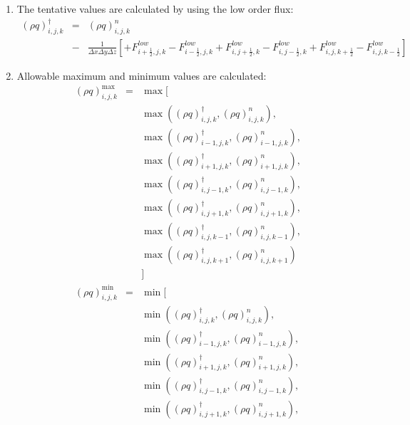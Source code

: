 \begin{enumerate}
%
\item The tentative values are calculated by using the low order flux:
\begin{eqnarray}
\left(\rho q\right)^{\dagger}_{i,j,k} 
&=& \left(\rho q\right)^{n}_{i,j,k}\nonumber\\
&-& \frac{1}{\Delta x \Delta y \Delta z}
\left[
+ F_{i+\frac{1}{2},j,k}^{low}-F_{i-\frac{1}{2},j,k}^{low}
+ F_{i,j+\frac{1}{2},k}^{low}-F_{i,j-\frac{1}{2},k}^{low}
+ F_{i,j,k+\frac{1}{2}}^{low}-F_{i,j,k-\frac{1}{2}}^{low}
\right]
\end{eqnarray}
%
\item Allowable maximum and minimum values are calculated:
\begin{eqnarray}
\left(\rho q\right)^{\max}_{i,j,k}
&=& \max [\nonumber\\
&&\max( \left(\rho q\right)^{\dagger}_{i,j,k},\left(\rho q\right)^{n}_{i,j,k} ),\nonumber\\
&&\max( \left(\rho q\right)^{\dagger}_{i-1,j,k},\left(\rho q\right)^{n}_{i-1,j,k} ),\nonumber\\
&&\max( \left(\rho q\right)^{\dagger}_{i+1,j,k},\left(\rho q\right)^{n}_{i+1,j,k} ),\nonumber\\
&&\max( \left(\rho q\right)^{\dagger}_{i,j-1,k},\left(\rho q\right)^{n}_{i,j-1,k} ),\nonumber\\
&&\max( \left(\rho q\right)^{\dagger}_{i,j+1,k},\left(\rho q\right)^{n}_{i,j+1,k} ),\nonumber\\
&&\max( \left(\rho q\right)^{\dagger}_{i,j,k-1},\left(\rho q\right)^{n}_{i,j,k-1} ),\nonumber\\
&&\max( \left(\rho q\right)^{\dagger}_{i,j,k+1},\left(\rho q\right)^{n}_{i,j,k+1} ) \nonumber\\
&&]\\
\left(\rho q\right)^{\min}_{i,j,k}
&=& \min [\nonumber\\
&&\min( \left(\rho q\right)^{\dagger}_{i,j,k},\left(\rho q\right)^{n}_{i,j,k} ),\nonumber\\
&&\min( \left(\rho q\right)^{\dagger}_{i-1,j,k},\left(\rho q\right)^{n}_{i-1,j,k} ),\nonumber\\
&&\min( \left(\rho q\right)^{\dagger}_{i+1,j,k},\left(\rho q\right)^{n}_{i+1,j,k} ),\nonumber\\
&&\min( \left(\rho q\right)^{\dagger}_{i,j-1,k},\left(\rho q\right)^{n}_{i,j-1,k} ),\nonumber\\
&&\min( \left(\rho q\right)^{\dagger}_{i,j+1,k},\left(\rho q\right)^{n}_{i,j+1,k} ),\nonumber\\

\end{eqnarray}
\end{enumerate}
